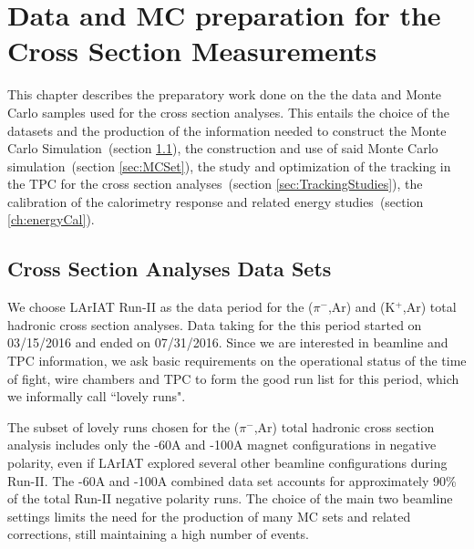 \chapter{Data and MC preparation for the Cross Section Measurements}\label{ch:samples}



This chapter describes the preparatory work done on the the data and Monte Carlo samples used for the cross section analyses. 
This entails the choice of the datasets and the production of the information needed to construct the Monte Carlo Simulation~(section \ref{sec:dataSet}),  the construction and use of said Monte Carlo simulation~(section \ref{sec:MCSet}), the study and optimization of the tracking in the TPC for the cross section analyses~(section \ref{sec:TrackingStudies}),  the calibration of the calorimetry response and related energy studies~(section \ref{ch:energyCal}). 



\section{Cross Section Analyses Data Sets}\label{sec:dataSet}
We choose LArIAT Run-II as the data period for the  ($\pi^{-}$,Ar) and (K$^{+}$,Ar) total hadronic cross section analyses. 
Data taking for the this period started on 03/15/2016  and ended on 07/31/2016. 
Since we are interested in beamline and TPC information, we ask basic requirements on the operational status of the time of fight, wire chambers and TPC to form the good run list for this period, which we informally call ``lovely runs".

The subset of lovely runs  chosen for the  ($\pi^{-}$,Ar) total hadronic cross section analysis includes only the -60A and -100A magnet configurations in negative polarity, even if LArIAT explored several other beamline configurations during Run-II. The -60A and -100A combined data set accounts for approximately 90\% of the total Run-II negative polarity runs.   The  choice of the main two beamline settings limits the need for the production of many MC sets and related corrections, still maintaining a high number of events. 

